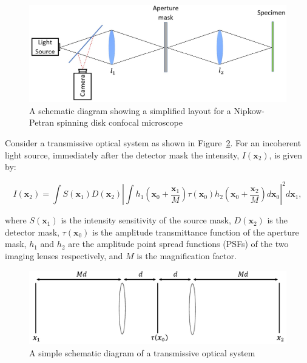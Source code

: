 \begin{figure}[h]
	\centering
	\includegraphics[width=\textwidth]{images/confocal_schematic.jpg}
	\caption[Simplified Nipkow-Petran confocal layout]{A schematic diagram showing a simplified layout for a Nipkow-Petran spinning disk confocal microscope}
	\label{fig:confocal_schematic}
\end{figure}

Consider a transmissive optical system as shown in 
Figure~\ref{fig:optical_system_schematic}. For an incoherent 
light source, immediately after the detector mask the 
intensity, $I\left(\textbf{x}_{2}\right)$, is given by:

\begin{equation}\label{eq:intensity_after_detector}
I\left(\textbf{x}_{2}\right) = \int S\left(\textbf{x}_{1}\right) D\left(\textbf{x}_{2}\right) \left| \int h_{1}\left(\textbf{x}_{0} + \frac{\textbf{x}_{1}}{M}\right) \tau\left(\textbf{x}_{0}\right) h_{2}\left(\textbf{x}_{0} + \frac{\textbf{x}_{2}}{M}\right)d\textbf{x}_{0}\right|^{2}d\textbf{x}_{1},
\end{equation}

where $S\left(\textbf{x}_{1}\right)$ is the intensity 
sensitivity of the source mask, $D\left(\textbf{x}_{2}\right)$ 
is the detector mask, $\tau\left(\textbf{x}_{0}\right)$ is 
the amplitude transmittance function of the aperture mask, 
$h_{1}$ and $h_{2}$ are the amplitude point spread functions 
(PSFs) of the two imaging lenses respectively, and $M$ is the 
magnification factor. 

\begin{figure}[h]
	\centering
	\includegraphics[width=\textwidth]{images/optical_system_schematic.jpg}
	\caption[A simple schematic diagram of a transmissive optical system]{A simple schematic diagram of a transmissive optical system}
	\label{fig:optical_system_schematic}
\end{figure}

